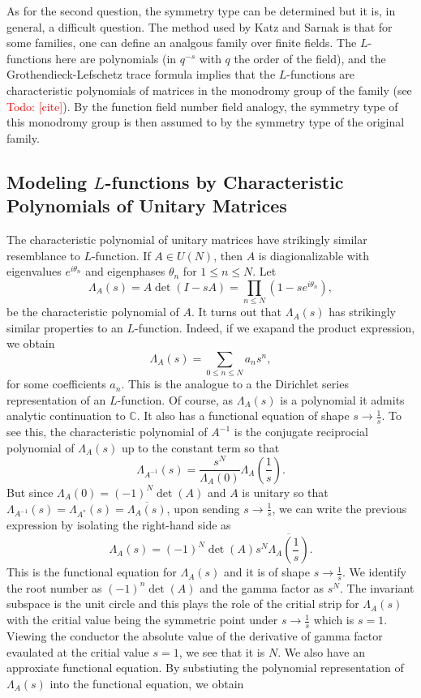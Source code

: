 \documentclass[12pt]{book}
\theoremstyle{definition}\newframedtheorem{method}{Method}
\newcommand{\C}{\mathbb{C}}
\renewcommand{\t}{\theta}
\renewcommand{\L}{\Lambda}
\newcommand{\<}{\langle}
\renewcommand{\>}{\rangle}
\newcommand{\conj}{\overline}
\newcommand{\todo}[1]{\textcolor{red}{\sf Todo: [#1]}}
\begin{document}
      As for the second question, the symmetry type can be determined but it is, in general, a difficult question. The method used by Katz and Sarnak is that for some families, one can define an analgous family over finite fields. The $L$-functions here are polynomials (in $q^{-s}$ with $q$ the order of the field), and the Grothendieck-Lefschetz trace formula implies that the $L$-functions are characteristic polynomials of matrices in the monodromy group of the family (see \todo{cite}). By the function field number field analogy, the symmetry type of this monodromy group is then assumed to by the symmetry type of the original family.
    \subsection*{Modeling $L$-functions by Characteristic Polynomials of Unitary Matrices}
      The characteristic polynomial of unitary matrices have strikingly similar resemblance to $L$-function. If $A \in U(N)$, then $A$ is diagionalizable with eigenvalues $e^{i\t_{n}}$ and eigenphases $\t_{n}$ for $1 \le n \le N$. Let
      \[
        \L_{A}(s) = A\det(I-sA) = \prod_{n \le N}(1-se^{i\t_{n}}),
      \]
      be the characteristic polynomial of $A$. It turns out that $\L_{A}(s)$ has strikingly similar properties to an $L$-function. Indeed, if we exapand the product expression, we obtain
      \[
        \L_{A}(s) = \sum_{0 \le n \le N}a_{n}s^{n},
      \]
      for some coefficients $a_{n}$. This is the analogue to a the Dirichlet series representation of an $L$-function. Of course, as $\L_{A}(s)$ is a polynomial it admits analytic continuation to $\C$. It also has a functional equation of shape $s \to \frac{1}{s}$. To see this, the characteristic polynomial of $A^{-1}$ is the conjugate reciprocial polynomial of $\L_{A}(s)$ up to the constant term so that
      \[
        \L_{A^{-1}}(s) = \frac{s^{N}}{\L_{A}(0)}\L_{A}\left(\frac{1}{s}\right).
      \]
      But since $\L_{A}(0) = (-1)^{N}\det(A)$ and $A$ is unitary so that $\L_{A^{-1}}(s) = \L_{A^{\ast}}(s) = \conj{\L_{A}(s)}$, upon sending $s \to \frac{1}{s}$, we can write the previous expression by isolating the right-hand side as
      \[
        \L_{A}(s) = (-1)^{N}\det(A)s^{N}\conj{\L_{A}\left(\frac{1}{s}\right)}.
      \]
      This is the functional equation for $\L_{A}(s)$ and it is of shape $s \to \frac{1}{s}$. We identify the root number as $(-1)^{n}\det(A)$ and the gamma factor as $s^{N}$. The invariant subspace is the unit circle and this plays the role of the critial strip for $\L_{A}(s)$ with the critial value being the symmetric point under $s \to \frac{1}{s}$ which is $s = 1$. Viewing the conductor the absolute value of the derivative of gamma factor evaulated at the critial value $s = 1$, we see that it is $N$. We also have an approxiate functional equation. By substiuting the polynomial representation of $\L_{A}(s)$ into the functional equation, we obtain
\end{document}

